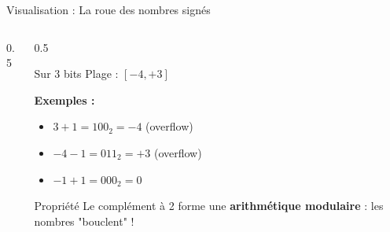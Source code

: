 \documentclass[aspectratio=1610]{beamer}
\begin{document}
\begin{frame}{Visualisation : La roue des nombres signés}

  \begin{columns}
    \begin{column}{0.5\textwidth}
      \begin{center}
      \end{center}
    \end{column}

    \begin{column}{0.5\textwidth}
      \begin{block}{Sur 3 bits}
        Plage : $[-4, +3]$
      \end{block}

      \vspace{0.5cm}

      \textbf{Exemples :}
      \begin{itemize}
        \item $3 + 1 = 100_2 = -4$ (overflow)
        \item $-4 - 1 = 011_2 = +3$ (overflow)
        \item $-1 + 1 = 000_2 = 0$ 
      \end{itemize}

      \vspace{0.5cm}

      \begin{alertblock}{Propriété}
        Le complément à 2 forme une \textbf{arithmétique modulaire} : les nombres "bouclent" !
      \end{alertblock}
    \end{column}
  \end{columns}

\end{frame}
\end{document}
